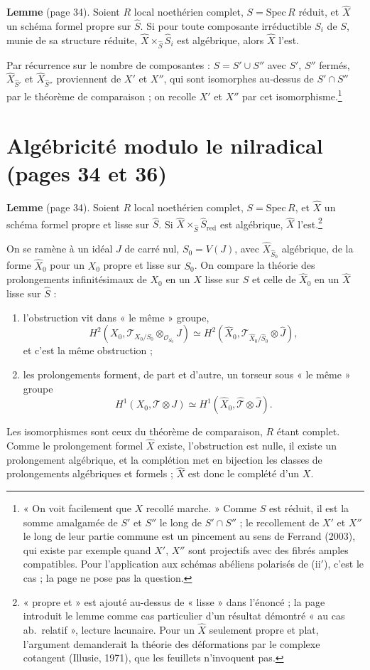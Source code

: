 \documentclass[11pt,a4paper]{article}
\begin{document}
\textbf{Lemme} (page 34). Soient $R$ local noethérien complet, $S =
\mathrm{Spec}\,R$ réduit, et $\hat X$ un schéma formel propre sur $\hat S$. Si
pour toute composante irréductible $S_i$ de $S$, munie de sa structure
réduite, $\hat X \times_{\hat S} \hat S_i$ est algébrique, alors $\hat X$
l'est.

Par récurrence sur le nombre de composantes : $S = S' \cup S''$ avec $S'$,
$S''$ fermés, $\hat X_{\hat S'}$ et $\hat X_{\hat S''}$ proviennent de $X'$ et
$X''$, qui sont isomorphes au-dessus de $S' \cap S''$ par le théorème de
comparaison ; on recolle $X'$ et $X''$ par cet isomorphisme.\footnote{« On voit
facilement que $X$ recollé marche. » Comme $S$ est réduit, il est la somme
amalgamée de $S'$ et $S''$ le long de $S' \cap S''$ ; le recollement de $X'$
et $X''$ le long de leur partie commune est un pincement au sens de Ferrand
(2003), qui existe par exemple quand $X'$, $X''$ sont projectifs avec des
fibrés amples compatibles. Pour l'application aux schémas abéliens polarisés
de (ii$'$), c'est le cas ; la page ne pose pas la question.}

\section*{Algébricité modulo le nilradical (pages 34 et 36)}

\textbf{Lemme} (page 34). Soient $R$ local noethérien complet,
$S = \mathrm{Spec}\,R$, et $\hat X$ un schéma formel propre et lisse sur
$\hat S$. Si $\hat X \times_{\hat S} \hat S_{\mathrm{red}}$ est algébrique,
$\hat X$ l'est.\footnote{« propre et » est ajouté au-dessus de « lisse »
dans l'énoncé ; la page introduit le lemme comme cas particulier d'un
résultat démontré « au cas ab.\ relatif », lecture lacunaire. Pour un
$\hat X$ seulement propre et plat, l'argument demanderait la théorie des
déformations par le complexe cotangent (Illusie, 1971), que les feuillets
n'invoquent pas.}

On se ramène à un idéal $J$ de carré nul, $S_0 = V(J)$, avec
$\hat X_{\hat S_0}$ algébrique, de la forme $\hat X_0$ pour un $X_0$ propre et
lisse sur $S_0$. On compare la théorie des prolongements infinitésimaux de
$X_0$ en un $X$ lisse sur $S$ et celle de $\hat X_0$ en un $\hat X$ lisse sur
$\hat S$ :
\begin{enumerate}
  \item[1°)] l'obstruction vit dans « le même » groupe,
  \[
    H^2(X_0, \mathcal{T}_{X_0/S_0} \otimes_{\mathcal{O}_{S_0}} J) \simeq
    H^2(\hat X_0, \mathcal{T}_{\hat X_0/\hat S_0} \otimes \hat J),
  \]
  et c'est la même obstruction ;
  \item[2°)] les prolongements forment, de part et d'autre, un torseur sous
  « le même » groupe
  \[
    H^1(X_0, \mathcal{T} \otimes J) \simeq H^1(\hat X_0, \hat{\mathcal{T}}
    \otimes \hat J).
  \]
\end{enumerate}
Les isomorphismes sont ceux du théorème de comparaison, $R$ étant complet.
Comme le prolongement formel $\hat X$ existe, l'obstruction est nulle, il
existe un prolongement algébrique, et la complétion met en bijection les
classes de prolongements algébriques et formels ; $\hat X$ est donc le complété
d'un $X$.
\end{document}
